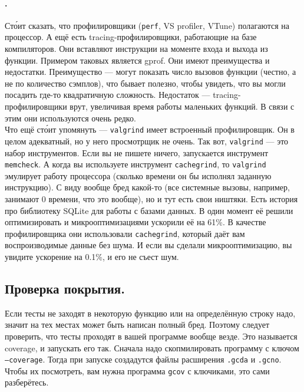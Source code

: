 \documentclass{article}
\begin{document}
    \paragraph{.}
    Ст\'{о}ит сказать, что профилировщики (\texttt{perf}, VS profiler, VTune) полагаются на процессор. А ещё есть tracing-профилировщики, работающие на базе компиляторов. Они вставляют инструкции на моменте входа и выхода из функции. Примером таковых является gprof. Они имеют преимущества и недостатки. Преимущество --- могут показать число вызовов функции (честно, а не по количество сэмплов), что бывает полезно, чтобы увидеть, что вы могли посадить где-то квадратичную сложность. Недостаток --- tracing-профилировщики врут, увеличивая время работы маленьких функций. В связи с этим они используются очень редко.\\
    Что ещё ст\'{о}ит упомянуть --- \texttt{valgrind} имеет встроенный профилировщик. Он в целом адекватный, но у него просмотрщик не очень. Так вот, \texttt{valgrind} --- это набор инструментов. Если вы не пишете ничего, запускается инструмент \texttt{memcheck}. А когда вы используете инструмент \texttt{cachegrind}, то \texttt{valgrind} эмулирует работу процессора (сколько времени он бы исполнял заданную инструкцию). С виду вообще бред какой-то (все системные вызовы, например, занимают 0 времени, что это вообще), но и тут есть свои ништяки. Есть история про библиотеку SQLite для работы с базами данных. В один момент её решили оптимизировать и микрооптимизациями ускорили её на 61\%. В качестве профилировщика они использовали \texttt{cachegrind}, который даёт вам воспроизводимые данные без шума. И если вы сделали микрооптимизацию, вы увидите ускорение на 0.1\%, и его не съест шум.
    \subsection{Проверка покрытия.}
    Если тесты не заходят в некоторую функцию или на определённую строку надо, значит на тех местах может быть написан полный бред. Поэтому следует проверить, что тесты проходят в вашей программе вообще везде. Это называется coverage, и запускать его так. Сначала надо скопмилировать программу с ключом \texttt{--coverage}. Тогда при запуске создадутся файлы расширения \texttt{.gcda} и \texttt{.gcno}. Чтобы их посмотреть, вам нужна программа \texttt{gcov} с ключиками, это сами разберётесь.
\end{document}
